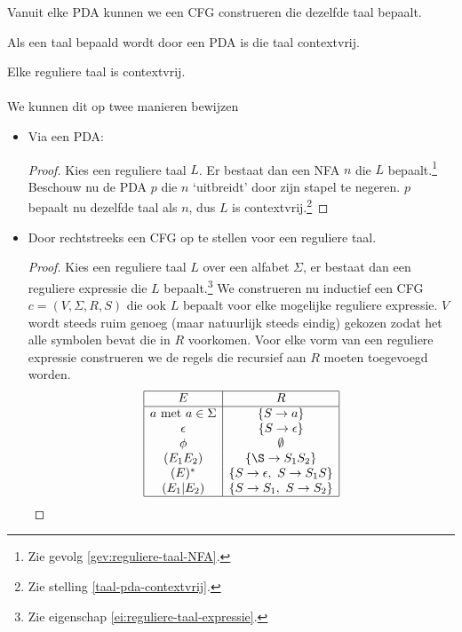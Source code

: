 \documentclass[main.tex]{subfiles}
\begin{document}
\begin{lem}
  \label{lem:pda-naar-cfg}
 Vanuit elke PDA kunnen we een CFG construeren die dezelfde taal bepaalt. 
\end{lem}

\begin{gev}
  \label{taal-pda-contextvrij}
  Als een taal bepaald wordt door een PDA is die taal contextvrij.
\end{gev}

\begin{gev}
  Elke reguliere taal is contextvrij.\\\\
  We kunnen dit op twee manieren bewijzen
  \begin{itemize}
  \item Via een PDA:
    \begin{proof}
      Kies een reguliere taal $L$. Er bestaat dan een NFA $n$ die $L$ bepaalt.\footnote{Zie gevolg \ref{gev:reguliere-taal-NFA}.}
      Beschouw nu de PDA $p$ die $n$ `uitbreidt' door zijn stapel te negeren.
      $p$ bepaalt nu dezelfde taal als $n$, dus $L$ is contextvrij.\footnote{Zie stelling \ref{taal-pda-contextvrij}.}
    \end{proof}
  \item Door rechtstreeks een CFG op te stellen voor een reguliere taal.
    \begin{proof}
      Kies een reguliere taal $L$ over een alfabet $\Sigma$, er bestaat dan een reguliere expressie die $L$ bepaalt.\footnote{Zie eigenschap \ref{ei:reguliere-taal-expressie}.}
      We construeren nu inductief een CFG $c = (V,\Sigma,R,S)$ die ook $L$ bepaalt voor elke mogelijke reguliere expressie.
      $V$ wordt steeds ruim genoeg (maar natuurlijk steeds eindig) gekozen zodat het alle symbolen bevat die in $R$ voorkomen.
      Voor elke vorm van een reguliere expressie construeren we de regels die recursief aan $R$ moeten toegevoegd worden.
      \[
      \begin{array}{|c|c|}
        \hline
        E                           & R\\
        \hline
        a \text{ met } a \in \Sigma & \{ S \rightarrow a \}\\
        \epsilon                    & \{ S \rightarrow \epsilon \} \\
        \phi                        & \emptyset\\
        (E_1E_2)                    & \{ \S \rightarrow S_{1}S_{2} \} \\
        (E)^{*}                      & \{ S \rightarrow \epsilon,\ S \rightarrow S_{1}S \}\\
        (E_1|E_2)                   & \{ S \rightarrow S_{1},\ S \rightarrow S_{2} \}\\
        \hline
      \end{array}
      \]
    \end{proof}
  \end{itemize}
\end{gev}
\end{document}
